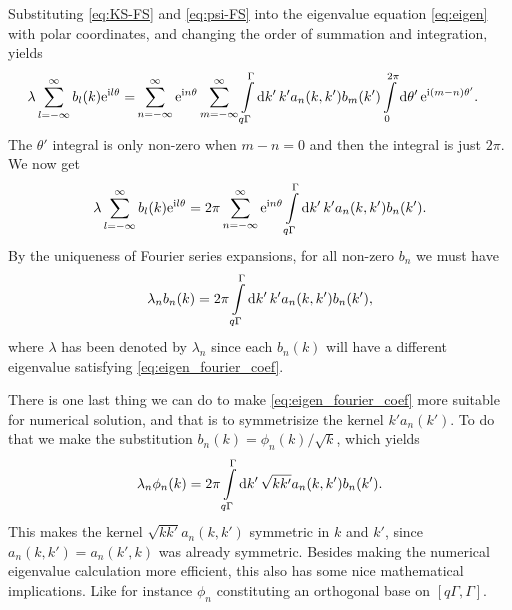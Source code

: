 \documentclass[11pt,a4paper, 
swedish,english %
]{article}
\begin{document}
Substituting \eqref{eq:KS-FS} and \eqref{eq:psi-FS} into the
eigenvalue equation \eqref{eq:eigen} with polar coordinates, and
changing the order of summation and integration, yields
\begin{equation}
\begin{aligned}
\lambda\sum_{l=-\infty}^\infty b_l(k)\ee^{\ii l\theta}
=& \sum_{n=-\infty}^\infty \ee^{\ii n\theta} \sum_{m=-\infty}^\infty 
\int_{q\Gamma}^\Gamma\rd{k'}\,k' a_n(k, k') b_m(k')
\int_{0}^{2\pi}\rd\theta'\,
\ee^{\ii (m-n)\theta'}.
\end{aligned}
\end{equation}
The $\theta'$ integral is only non-zero when $m-n=0$ and
then the integral is just $2\pi$. We now get
\begin{equation}
\lambda\sum_{l=-\infty}^\infty b_l(k)\ee^{\ii l\theta}
= 2\pi\sum_{n=-\infty}^\infty \ee^{\ii n\theta} 
\int_{q\Gamma}^\Gamma\rd{k'}\,k' a_n(k, k') b_n(k').
\end{equation}
By the uniqueness of Fourier series expansions, for all non-zero $b_n$
we must have 
\begin{equation}
\label{eq:eigen_fourier_coef}
\lambda_n b_n(k) = 2\pi\int_{q\Gamma}^\Gamma\rd{k'}\,k' a_n(k, k') b_n(k'),
\end{equation}
where $\lambda$ has been denoted by $\lambda_n$ since each $b_n(k)$
will have a different eigenvalue satisfying
\eqref{eq:eigen_fourier_coef}.  

There is one last thing we can do to make
\eqref{eq:eigen_fourier_coef} more suitable for numerical solution,
and that is to symmetrisize the kernel $k'a_n(k')$. To do that we
make the substitution $b_n(k)=\phi_n(k)/\sqrt{k}$, which yields
\begin{equation}
\lambda_n \phi_n(k) = 2\pi\int_{q\Gamma}^\Gamma\rd{k'}\,
\sqrt{kk'}a_n(k, k') b_n(k').
\end{equation}
This makes the kernel $\sqrt{kk'}a_n(k, k')$ symmetric in $k$ and
$k'$, since $a_n(k, k')=a_n(k', k)$ was already symmetric. Besides
making the numerical eigenvalue calculation more efficient, this also
has some nice mathematical implications. Like for instance $\phi_n$
constituting an orthogonal base on $[q\Gamma, \Gamma]$.
\end{document}
